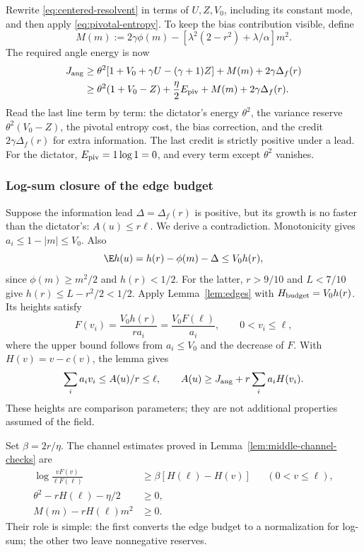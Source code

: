 Rewrite \eqref{eq:centered-resolvent} in terms of \(U,Z,V_0\), including
its constant mode, and then apply \eqref{eq:pivotal-entropy}.
To keep the bias contribution visible, define
\[
 M(m):=2\gamma\phi(m)-[\lambda^2(2-r^2)+\lambda/\alpha]m^2.
\]
The required angle energy is now
\begin{align}
 J_{\rm ang}
 &\ge\theta^2[1+V_0+\gamma U-(\gamma+1)Z]
          +M(m)+2\gamma\Delta_f(r)\notag\\
 &\ge\theta^2(1+V_0-Z)+\frac{\eta}{2}E_{\rm piv}
          +M(m)+2\gamma\Delta_f(r).                 \label{eq:pivotal-baseline}
\end{align}
Read the last line term by term: the dictator's energy \(\theta^2\),
the variance reserve \(\theta^2(V_0-Z)\), the pivotal entropy cost,
the bias correction, and the credit \(2\gamma\Delta_f(r)\) for extra
information. The last credit is strictly positive under a lead.
For the dictator, \(E_{\rm piv}=1\log1=0\), and every term except
\(\theta^2\) vanishes.

\subsubsection{Log-sum closure of the edge budget}

Suppose the information lead \(\Delta=\Delta_f(r)\) is positive,
but its growth is no faster than the dictator's: \(A(u)\le r\ell\).
We derive a contradiction.
Monotonicity gives \(a_i\le1-|m|\le V_0\). Also
\[
 \E h(u)=h(r)-\phi(m)-\Delta\le V_0h(r),
\]
since \(\phi(m)\ge m^2/2\) and \(h(r)<1/2\).
For the latter, \(r>9/10\) and \(L<7/10\) give
\(h(r)\le L-r^2/2<1/2\).
Apply Lemma~\ref{lem:edges} with
\(H_{\rm budget}=V_0h(r)\). Its heights satisfy
\[
 F(v_i)=\frac{V_0h(r)}{r a_i}=\frac{V_0F(\ell)}{a_i},
 \qquad 0<v_i\le\ell,
\]
where the upper bound follows from \(a_i\le V_0\) and the decrease
of \(F\). With \(H(v)=v-c(v)\), the lemma gives
\begin{equation}
 \sum_i a_i v_i\le A(u)/r\le\ell,\qquad
 A(u)\ge J_{\rm ang}+r\sum_i a_iH(v_i).
 \label{eq:adjusted-edge}
\end{equation}
These heights are comparison parameters; they are not additional
properties assumed of the field.

Set \(\beta=2r/\eta\). The channel estimates proved in
Lemma~\ref{lem:middle-channel-checks} are
\begin{align}
 \log\frac{vF(v)}{\ell F(\ell)}
       &\ge\beta[H(\ell)-H(v)] &&(0<v\le\ell), \label{eq:middle-profile}\\
 \theta^2-rH(\ell)-\eta/2&\ge0,                \label{eq:middle-energy}\\
 M(m)-rH(\ell)m^2&\ge0.                       \label{eq:middle-mean}
\end{align}
Their role is simple: the first converts the edge budget to a
normalization for log-sum; the other two leave nonnegative reserves.

